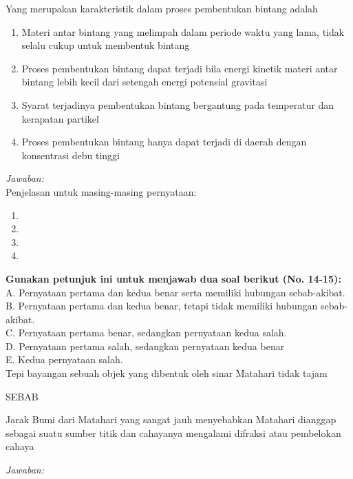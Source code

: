 \documentclass[11pt,fleqn, a4paper]{exam}
\begin{document}
\begin{questions}
\vspace{0.5cm}
\question Yang merupakan karakteristik dalam proses pembentukan bintang adalah
\begin{enumerate}
\item Materi antar bintang yang melimpah dalam periode waktu yang lama, tidak selalu cukup untuk membentuk bintang
\item Proses pembentukan bintang dapat terjadi bila energi kinetik materi antar bintang lebih kecil dari setengah energi potensial gravitasi
\item Syarat terjadinya pembentukan bintang bergantung pada temperatur dan kerapatan partikel
\item Proses pembentukan bintang hanya dapat terjadi di daerah dengan konsentrasi debu tinggi
\end{enumerate}

\textit{Jawaban: }\\
Penjelasan untuk masing-masing pernyataan:
\begin{enumerate}
\item 
\item 
\item 
\item 
\end{enumerate}


\vspace{1cm}
\textbf{Gunakan petunjuk ini untuk menjawab dua soal berikut (No. 14-15):}\\
A. Pernyataan pertama dan kedua benar serta memiliki hubungan sebab-akibat.\\
B. Pernyataan pertama dan kedua benar, tetapi tidak memiliki hubungan sebab-akibat.\\
C. Pernyataan pertama benar, sedangkan pernyataan kedua salah.\\
D. Pernyataan pertama salah, sedangkan pernyataan kedua benar\\
E. Kedua pernyataan salah.\\

\vspace{0.5cm}
\question Tepi bayangan sebuah objek yang dibentuk oleh sinar Matahari tidak tajam
\begin{center}
SEBAB
\end{center}
\noindent Jarak Bumi dari Matahari yang sangat jauh menyebabkan Matahari dianggap sebagai suatu sumber titik dan cahayanya mengalami difraksi atau pembelokan cahaya  

\textit{Jawaban: }\\



\end{questions}
\end{document}
